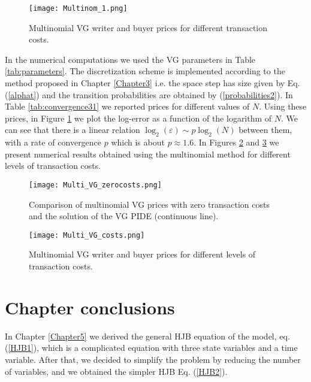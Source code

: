 \begin{figure}[t!]
  \centering
   \texttt{[image: Multinom\_1.png]}
   \caption{Multinomial VG writer and buyer prices for different transaction costs.}
   \label{Fig37}
\end{figure}  
In the numerical computations we used the VG parameters in Table \ref{tab:parameters}. 
The discretization scheme is implemented according to the method proposed in Chapter \ref{Chapter3} i.e. the space step has size given by Eq. (\ref{alphat}) and 
the transition probabilities are obtained by (\ref{probabilities2}). 
In Table \ref{tab:convergence31} we reported prices for different values of $N$.
Using these prices, in Figure \ref{Fig37} we plot the log-error as a function of the logarithm of $N$. We can see that there is a linear relation 
$\log_2(\varepsilon) \sim p \log_2(N)$ between them, with a rate of convergence $p$ which is about $p \approx 1.6$. 
In Figures \ref{Fig32} and \ref{Fig33} we present numerical results obtained using the multinomial method for different levels of transaction costs. 
\begin{figure}[t!]
   \centering
   \texttt{[image: Multi\_VG\_zerocosts.png]}
   \caption{Comparison of multinomial VG prices with zero transaction costs and the solution of the VG PIDE (continuous line).}
   \label{Fig32} 
\end{figure}
\begin{figure}[t!]
  \centering
   \texttt{[image: Multi\_VG\_costs.png]}
   \caption{Multinomial VG writer and buyer prices for different levels of transaction costs.}
   \label{Fig33}
\end{figure}  






\section{Chapter conclusions}


In Chapter \ref{Chapter5} we derived the general HJB equation of the model, eq. (\ref{HJB1}), which is 
a complicated equation with three state variables and a time variable. 
After that, we decided to simplify the problem by reducing the number of variables, and we obtained the simpler HJB Eq. (\ref{HJB2}).

